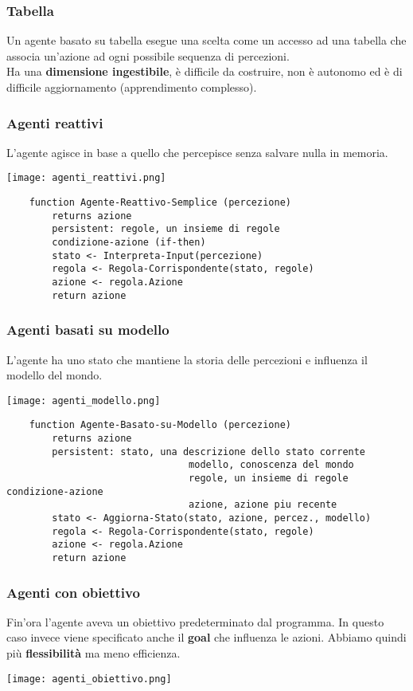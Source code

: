 \subsubsection{Tabella}
Un agente basato su tabella esegue una scelta come un accesso ad una tabella che associa un'azione ad ogni possibile sequenza di percezioni.\\
Ha una \textbf{dimensione ingestibile}, è difficile da costruire, non è autonomo ed è di difficile aggiornamento (apprendimento complesso).

\subsubsection{Agenti reattivi}
L'agente agisce in base a quello che percepisce senza salvare nulla in memoria.
\begin{center}
	\texttt{[image: agenti\_reattivi.png]}
\end{center}
\begin{lstlisting}
	function Agente-Reattivo-Semplice (percezione)
		returns azione
		persistent: regole, un insieme di regole
		condizione-azione (if-then)
		stato <- Interpreta-Input(percezione)
		regola <- Regola-Corrispondente(stato, regole)
		azione <- regola.Azione
		return azione
\end{lstlisting}

\subsubsection{Agenti basati su modello}
L'agente ha uno stato che mantiene la storia delle percezioni e influenza il modello del mondo.
\begin{center}
	\texttt{[image: agenti\_modello.png]}
\end{center}
\begin{lstlisting}
	function Agente-Basato-su-Modello (percezione)
		returns azione
		persistent: stato, una descrizione dello stato corrente
								modello, conoscenza del mondo
								regole, un insieme di regole condizione-azione
								azione, azione piu recente
		stato <- Aggiorna-Stato(stato, azione, percez., modello)
		regola <- Regola-Corrispondente(stato, regole)
		azione <- regola.Azione
		return azione
\end{lstlisting}

\subsubsection{Agenti con obiettivo}
Fin'ora l'agente aveva un obiettivo predeterminato dal programma. In questo caso invece viene specificato anche il \textbf{goal} che influenza le azioni. Abbiamo quindi più \textbf{flessibilità} ma meno efficienza.
\begin{center}
	\texttt{[image: agenti\_obiettivo.png]}
\end{center}

